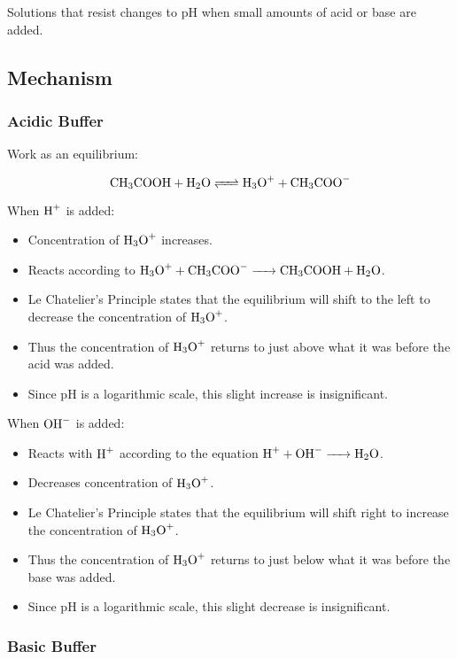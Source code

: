 \documentclass[a4paper,11pt]{article}
\begin{document}
Solutions that resist changes to pH when small amounts of acid or base are
added.


\subsection{Mechanism}

\subsubsection{Acidic Buffer}

Work as an equilibrium:

$$
\ce{CH3COOH + H2O <=> H3O+ + CH3COO-}
$$

When $\ce{H+}$ is added:

\begin{itemize}
\item Concentration of $\ce{H3O+}$ increases.
\item Reacts according to $\ce{H3O+ + CH3COO- -> CH3COOH + H2O}$.
\item Le Chatelier's Principle states that the equilibrium will shift to the
	left to decrease the concentration of $\ce{H3O+}$.
\item Thus the concentration of $\ce{H3O+}$ returns to just above what it was
	before the acid was added.
\item Since pH is a logarithmic scale, this slight increase is insignificant.
\end{itemize}

When $\ce{OH-}$ is added:

\begin{itemize}
\item Reacts with $\ce{H+}$ according to the equation $\ce{H+ + OH- -> H2O}$.
\item Decreases concentration of $\ce{H3O+}$.
\item Le Chatelier's Principle states that the equilibrium will shift right to
	increase the concentration of $\ce{H3O+}$.
\item Thus the concentration of $\ce{H3O+}$ returns to just below what it was
	before the base was added.
\item Since pH is a logarithmic scale, this slight decrease is insignificant.
\end{itemize}


\subsubsection{Basic Buffer}
\end{document}
